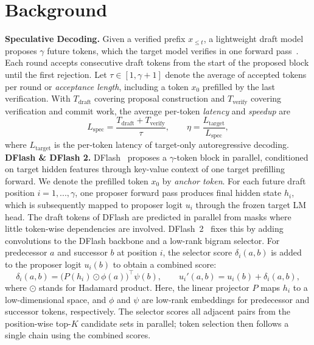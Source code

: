 \section{Background}
  \label{sec:method_prelim}
  \noindent\textbf{Speculative Decoding.}
  \label{sec:prelim_spec_decoding}
  Given a verified prefix $x_{\le t}$, a lightweight draft model proposes $\gamma$ future tokens, which the target model verifies in one forward pass~\citep{leviathan2023fast,chen2023accelerating}.
  Each round accepts consecutive draft tokens from the start of the proposed block until the first rejection.
  Let $\tau\in[1,\gamma+1]$ denote the average of accepted tokens per round or \textit{acceptance length}, including a token $x_0$ prefilled by the last verification.
  With $T_{\mathrm{draft}}$ covering proposal construction and $T_{\mathrm{verify}}$ covering verification and commit work, the average per-token \textit{latency} and \textit{speedup} are~\citep{chen2026dflash,huang2026domino}
  \begin{equation}
      L_{\mathrm{spec}}=\frac{T_{\mathrm{draft}}+T_{\mathrm{verify}}}{\tau},
      \qquad
      \eta=\frac{L_{\mathrm{target}}}{L_{\mathrm{spec}}},
      \label{eq:spec-latency}
  \end{equation}
  where $L_{\mathrm{target}}$ is the per-token latency of target-only autoregressive decoding.
  \noindent\textbf{DFlash \& DFlash 2.}
  \label{sec:prelim-dflash2}
  DFlash~\citep{chen2026dflash} proposes a $\gamma$-token block in parallel, conditioned on target hidden features through key-value context of one target prefilling forward. We denote the prefilled token $x_0$ by \textit{anchor token}. For each future draft position $i=1,...,\gamma$, one proposer forward pass produces final hidden state $h_i$, which is subsequently mapped to proposer logit $u_i$ through the frozen target LM head. The draft tokens of DFlash are predicted in parallel from masks where little token-wise dependencies are involved. DFlash~2~\citep{inco2026dflash2} fixes this by adding convolutions to the DFlash backbone and a low-rank bigram selector. For predecessor $a$ and successor $b$ at position $i$, the selector score $\delta_i(a,b)$ is added to the proposer logit $u_i(b)$ to obtain a combined score:
  \begin{equation}
      \delta_i(a,b)=\bigl(P(h_i)\odot \phi(a)\bigr)^\top \psi(b),
      \qquad
      u_i'(a,b)=u_i(b)+\delta_i(a,b),
      \label{eq:dflash2-selector}
  \end{equation}
  where $\odot$ stands for Hadamard product. Here, the linear projector $P$ maps $h_i$ to a low-dimensional space, and $\phi$ and $\psi$ are low-rank embeddings for predecessor and successor tokens, respectively. The selector scores all adjacent pairs from the position-wise top-$K$ candidate sets in parallel; token selection then follows a single chain using the combined scores.

